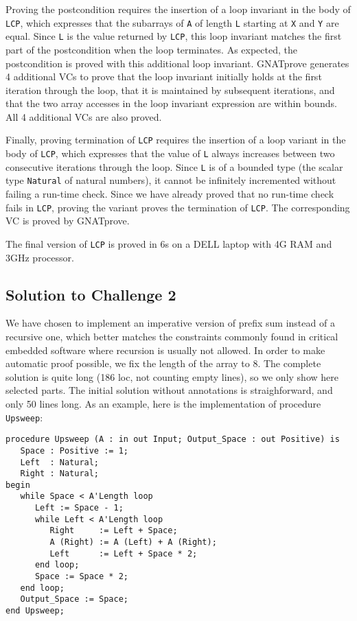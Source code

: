 \documentclass[sttt,draft]{svjour}
\newcommand{\gnatprove}{GNATprove\xspace}
\begin{document}
Proving the postcondition requires the insertion of a loop invariant in the
body of \verb|LCP|, which expresses that the subarrays of \verb|A| of length
\verb|L| starting at \verb|X| and \verb|Y| are equal. Since \verb|L| is the
value returned by \verb|LCP|, this loop invariant matches the first part of the
postcondition when the loop terminates. As expected, the postcondition is
proved with this additional loop invariant. \gnatprove generates 4 additional
VCs to prove that the loop invariant initially holds at the first iteration
through the loop, that it is maintained by subsequent iterations, and that the
two array accesses in the loop invariant expression are within bounds. All 4
additional VCs are also proved.

Finally, proving termination of \verb|LCP| requires the insertion of a loop
variant in the body of \verb|LCP|, which expresses that the value of \verb|L|
always increases between two consecutive iterations through the loop. Since
\verb|L| is of a bounded type (the scalar type \verb|Natural| of natural
numbers), it cannot be infinitely incremented without failing a run-time
check. Since we have already proved that no run-time check fails in \verb|LCP|,
proving the variant proves the termination of \verb|LCP|. The corresponding VC
is proved by \gnatprove.

The final version of \verb|LCP| is proved in 6s on a DELL laptop with 4G RAM
and 3GHz processor.

\subsection{Solution to Challenge 2}

We have chosen to implement an imperative version of prefix sum instead of a
recursive one, which better matches the constraints commonly found in critical
embedded software where recursion is usually not allowed. In order to make
automatic proof possible, we fix the length of the array to 8. The complete
solution is quite long (186 loc, not counting empty lines), so we only show
here selected parts. The initial solution without annotations is
straighforward, and only 50 lines long. As an example, here is the
implementation of procedure \verb|Upsweep|:

\begin{footnotesize}
\begin{verbatim}
procedure Upsweep (A : in out Input; Output_Space : out Positive) is
   Space : Positive := 1;
   Left  : Natural;
   Right : Natural;
begin
   while Space < A'Length loop
      Left := Space - 1;
      while Left < A'Length loop
         Right     := Left + Space;
         A (Right) := A (Left) + A (Right);
         Left      := Left + Space * 2;
      end loop;
      Space := Space * 2;
   end loop;
   Output_Space := Space;
end Upsweep;
\end{verbatim}
\end{footnotesize}
\end{document}

